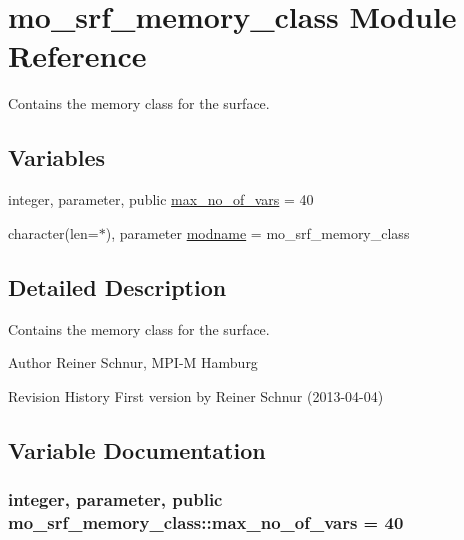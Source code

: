 \hypertarget{namespacemo__srf__memory__class}{}\section{mo\+\_\+srf\+\_\+memory\+\_\+class Module Reference}
\label{namespacemo__srf__memory__class}


Contains the memory class for the surface.  


\subsection*{Variables}
\begin{DoxyCompactItemize}
\item 
integer, parameter, public \hyperlink{namespacemo__srf__memory__class_aad4af66f23616b09c838d1d25b33d13b}{max\+\_\+no\+\_\+of\+\_\+vars} = 40
\item 
character(len=$\ast$), parameter \hyperlink{namespacemo__srf__memory__class_a0e5b6ff2ea39b47afe54d1162df39955}{modname} = \textquotesingle{}mo\+\_\+srf\+\_\+memory\+\_\+class\textquotesingle{}
\end{DoxyCompactItemize}


\subsection{Detailed Description}
Contains the memory class for the surface. 

\begin{DoxyAuthor}{Author}
Reiner Schnur, M\+P\+I-\/\+M Hamburg
\end{DoxyAuthor}
\begin{DoxyParagraph}{Revision History}
First version by Reiner Schnur (2013-\/04-\/04) 
\end{DoxyParagraph}


\subsection{Variable Documentation}
\hypertarget{namespacemo__srf__memory__class_aad4af66f23616b09c838d1d25b33d13b}{}
\subsubsection[{max\+\_\+no\+\_\+of\+\_\+vars}]{\setlength{\rightskip}{0pt plus 5cm}integer, parameter, public mo\+\_\+srf\+\_\+memory\+\_\+class\+::max\+\_\+no\+\_\+of\+\_\+vars = 40}\label{namespacemo__srf__memory__class_aad4af66f23616b09c838d1d25b33d13b}



